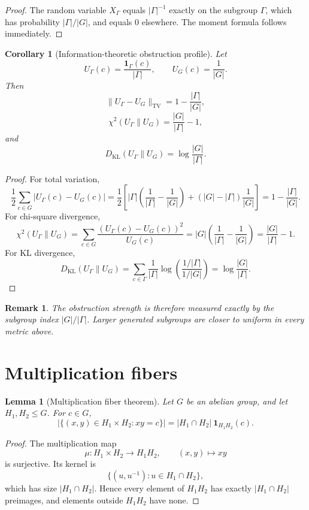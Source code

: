 \documentclass[11pt]{article}
\newtheorem{lemma}{Lemma}
\newtheorem{corollary}{Corollary}
\newtheorem{remark}{Remark}
\newcommand{\1}{\mathbf 1}
\newcommand{\TV}{\operatorname{TV}}
\newcommand{\KL}{D_{\operatorname{KL}}}
\begin{document}
\begin{proof}
The random variable \(X_\Gamma\) equals \(|\Gamma|^{-1}\) exactly on the subgroup \(\Gamma\), which has probability \(|\Gamma|/|G|\), and equals \(0\) elsewhere.  The moment formula follows immediately.
\end{proof}

\begin{corollary}[Information-theoretic obstruction profile]\label{C:info}
Let
\[
U_\Gamma(c)=\frac{\1_\Gamma(c)}{|\Gamma|},
\qquad
U_G(c)=\frac1{|G|}.
\]
Then
\[
\|U_\Gamma-U_G\|_{\TV}
=
1-\frac{|\Gamma|}{|G|},
\]
\[
\chi^2(U_\Gamma\|U_G)
=
\frac{|G|}{|\Gamma|}-1,
\]
and
\[
\KL(U_\Gamma\|U_G)
=
\log\frac{|G|}{|\Gamma|}.
\]
\end{corollary}

\begin{proof}
For total variation,
\[
\frac12\sum_{c\in G}\left|U_\Gamma(c)-U_G(c)\right|
=
\frac12\left[
|\Gamma|\left(\frac1{|\Gamma|}-\frac1{|G|}\right)
+
(|G|-|\Gamma|)\frac1{|G|}
\right]
=
1-\frac{|\Gamma|}{|G|}.
\]
For chi-square divergence,
\[
\chi^2(U_\Gamma\|U_G)
=
\sum_{c\in G}\frac{(U_\Gamma(c)-U_G(c))^2}{U_G(c)}
=
|G|\left(\frac1{|\Gamma|}-\frac1{|G|}\right)
=
\frac{|G|}{|\Gamma|}-1.
\]
For KL divergence,
\[
\KL(U_\Gamma\|U_G)
=
\sum_{c\in\Gamma}\frac1{|\Gamma|}
\log\left(\frac{1/|\Gamma|}{1/|G|}\right)
=
\log\frac{|G|}{|\Gamma|}.
\]
\end{proof}

\begin{remark}
The obstruction strength is therefore measured exactly by the subgroup index \(|G|/|\Gamma|\).  Larger generated subgroups are closer to uniform in every metric above.
\end{remark}

\section{Multiplication fibers}

\begin{lemma}[Multiplication fiber theorem]\label{L:fiber}
Let \(G\) be an abelian group, and let \(H_1,H_2\le G\).  For \(c\in G\),
\[
|\{(x,y)\in H_1\times H_2:xy=c\}|
=
|H_1\cap H_2|\ \1_{H_1H_2}(c).
\]
\end{lemma}

\begin{proof}
The multiplication map
\[
\mu:H_1\times H_2\to H_1H_2,\qquad (x,y)\mapsto xy
\]
is surjective.  Its kernel is
\[
\{(u,u^{-1}):u\in H_1\cap H_2\},
\]
which has size \(|H_1\cap H_2|\).  Hence every element of \(H_1H_2\) has exactly \(|H_1\cap H_2|\) preimages, and elements outside \(H_1H_2\) have none.
\end{proof}
\end{document}
